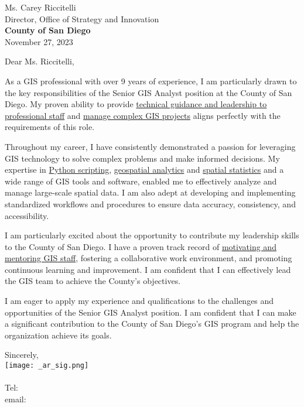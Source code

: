 \documentclass[letterpaper]{article}
\newcommand{\impt}[1]{\uline{#1}}
\newcommand{\CVcompany}{County of San Diego}
\begin{document}
\large
Ms. Carey Riccitelli \\
Director, Office of Strategy and Innovation \\
\textbf{\CVcompany} \\

\null\hfill November 27, 2023

Dear Ms. Riccitelli,

As a GIS professional with over 9 years of experience, I am
particularly drawn to the key responsibilities of the Senior GIS Analyst
position at the County of San Diego. My proven ability to provide 
\impt{technical guidance and leadership to professional staff}
and \impt{manage complex GIS projects}
aligns perfectly with the requirements of this
role.

Throughout my career, I have consistently demonstrated a passion for leveraging
GIS technology to solve complex problems and make informed decisions. My
expertise in 
\impt{Python scripting}, \impt{geospatial analytics} and \impt{spatial statistics} and a wide
range of GIS tools and software,
enabled me to effectively analyze and manage large-scale spatial data. I am
also adept at developing and implementing standardized workflows and procedures
to ensure data accuracy, consistency, and accessibility.

I am particularly excited about the opportunity to contribute my leadership
skills to the County of San Diego. I have a proven track record of 
\impt{motivating and mentoring GIS staff}, fostering a collaborative work environment, and
promoting continuous learning and improvement. I am confident that I can
effectively lead the GIS team to achieve the County's objectives.

I am eager to apply my experience and qualifications to the challenges and
opportunities of the Senior GIS Analyst position. I am confident that I can
make a significant contribution to the County of San Diego's GIS program and
help the organization achieve its goals.

Sincerely,\\
    \hspace{1em}
    \texttt{[image: \_ar\_sig.png]} \\
    \CVsigname \\
    \small
    Tel: \CVphone \\
    email: \CVemail
\end{document}
